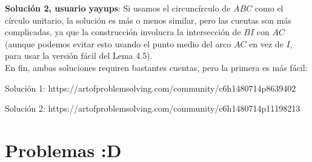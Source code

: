 \documentclass[11pt]{scrartcl}
\begin{document}
\textbf{Solución 2, usuario yayups}: Si usamos el circuncírculo de $ABC$ como el círculo unitario, la solución es más o menos similar, pero las cuentas son más complicadas, ya que la construcción involucra la intersección de $BI$ con $AC$ (aunque podemos evitar esto usando el punto medio del arco $AC$ en vez de $I$, para usar la versión fácil del Lema 4.5). \\

En fin, ambas soluciones requiren bastantes cuentas, pero la primera es más fácil:


Solución 1: https://artofproblemsolving.com/community/c6h1480714p8639402

Solución 2: https://artofproblemsolving.com/community/c6h1480714p11198213

\section{Problemas :D}
\end{document}
